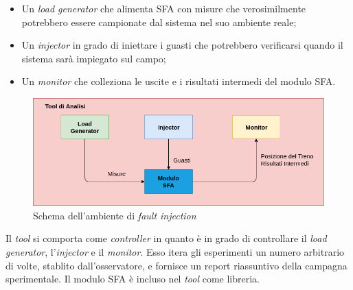 \begin{itemize}
	\item Un \emph{load generator} che alimenta SFA con misure che verosimilmente potrebbero essere campionate dal sistema nel suo ambiente reale;
	\item Un \emph{injector} in grado di iniettare i guasti che potrebbero verificarsi quando il sistema sar\`a impiegato sul campo;
	\item Un \emph{monitor} che colleziona le uscite e i risultati intermedi del modulo SFA.
\end{itemize}
\begin{figure}[h]
	\centering
	\includegraphics[width=0.7\linewidth]{img/faultinjrtt}
	\caption{Schema dell'ambiente di \emph{fault injection}}
	\label{fig:faultinjrtt}
\end{figure}
Il \emph{tool} si comporta come \emph{controller} in quanto \`e in grado di controllare il \emph{load generator}, l'\emph{injector} e il \emph{monitor}. Esso itera gli esperimenti un numero arbitrario di volte, stablito dall'osservatore, e fornisce un report riassuntivo della campagna sperimentale. Il modulo SFA \`e incluso nel \emph{tool} come libreria.
